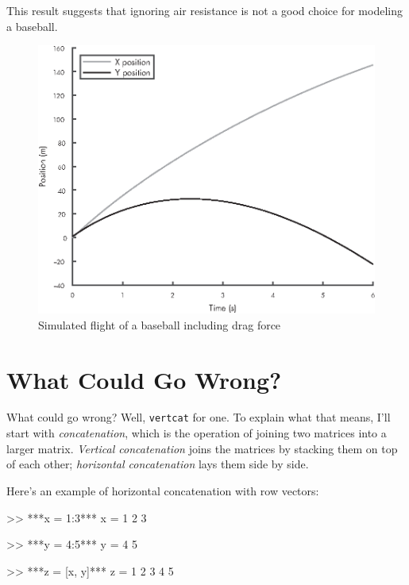 \newpage
This result suggests that ignoring air resistance is not a good choice for modeling a baseball.

\begin{figure}
\includegraphics[scale=0.90]{book/images/figure12_04_new.eps}
\caption{Simulated flight of a baseball including drag force}
\label{fig:baseball2}
\end{figure}

\section{What Could Go Wrong?}

What could go wrong?  Well, \lstinline{vertcat} for one.  To explain
what that means, I'll start with \emph{concatenation}, which is
the operation of joining two matrices into a larger matrix.
\emph{Vertical concatenation} joins the matrices by stacking them on
top of each other; \emph{horizontal concatenation} lays them
side by side.


Here's an example of horizontal concatenation with row vectors:

\begin{code}
>> ***x = 1:3***
x = 1     2     3

>> ***y = 4:5***
y = 4     5

>> ***z = [x, y]***
z = 1     2     3     4     5
\end{code}

